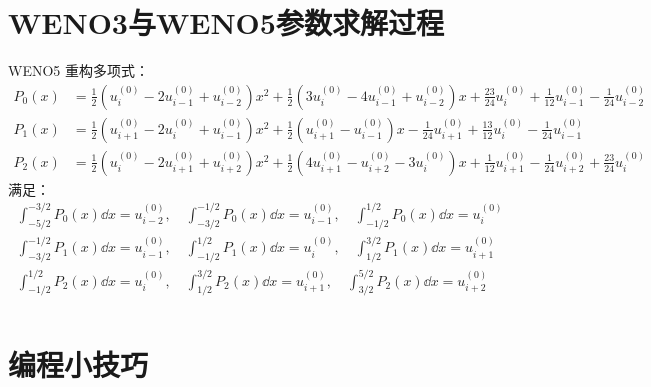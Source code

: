 \documentclass{book}
\begin{document}
\begin{example}
\begin{example}{}{}
\begin{example}
\begin{example}
\begin{example}
\section{WENO3与WENO5参数求解过程}
WENO5 重构多项式：
\begin{equation}
    \begin{aligned}
        P_0(x) & = \frac{1}{2} \left(u_{i}^{(0)} - 2 u_{i-1}^{(0)} + u_{i-2}^{(0)}\right)x^2 + \frac{1}{2} \left(3  u_{i}^{(0)} - 4 u_{i-1}^{(0)} + u_{i-2}^{(0)}\right)  x + \frac{23}{24}u_{i}^{(0)} +\frac{1}{12} u_{i-1}^{(0)} -\frac{1}{24} u_{i-2}^{(0)}        \\
        P_1(x) & = \frac{1}{2} \left(u_{i+1}^{(0)} - 2  u_{i}^{(0)} + u_{i-1}^{(0)}\right)x^2 + \frac{1}{2}  \left(u_{i+1}^{(0)} - u_{i-1}^{(0)}\right)  x -\frac{1}{24}  u_{i+1}^{(0)} + \frac{13}{12}  u_{i}^{(0)} -\frac{1}{24}  u_{i-1}^{(0)}                     \\
        P_2(x) & = \frac{1}{2}  \left(u_{i}^{(0)} - 2  u_{i+1}^{(0)} + u_{i+2}^{(0)}\right)x^2 + \frac{1}{2}\left(4  u_{i+1}^{(0)} - u_{i+2}^{(0)} - 3  u_{i}^{(0)}\right)  x + \frac{1}{12}  u_{i+1}^{(0)} -\frac{1}{24}  u_{i+2}^{(0)} + \frac{23}{24}  u_{i}^{(0)}
    \end{aligned}
\end{equation}
满足：
\begin{equation}
    \begin{aligned}
        \int_{-5/2}^{-3/2} P_0(x)\dd x = u_{i-2}^{(0)},\quad \int_{-3/2}^{-1/2} P_0(x)\dd x = u_{i-1}^{(0)},\quad \int_{-1/2}^{1/2} P_0(x)\dd x = u_{i}^{(0)} \\
        \int_{-3/2}^{-1/2} P_1(x)\dd x = u_{i-1}^{(0)},\quad \int_{-1/2}^{1/2} P_1(x)\dd x = u_{i}^{(0)},\quad \int_{1/2}^{3/2} P_1(x)\dd x = u_{i+1}^{(0)}   \\
        \int_{-1/2}^{1/2} P_2(x)\dd x = u_{i}^{(0)},\quad \int_{1/2}^{3/2} P_2(x)\dd x = u_{i+1}^{(0)},\quad \int_{3/2}^{5/2} P_2(x)\dd x = u_{i+2}^{(0)}     \\
    \end{aligned}
\end{equation}






\section{编程小技巧}

\end{example}
\end{example}
\end{example}
\end{example}
\end{example}
\end{document}
